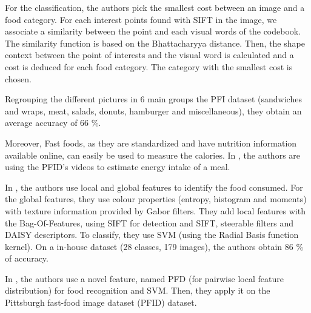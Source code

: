 For the classification, the authors pick the smallest cost between an image and a food category. For each interest points found with SIFT in the image, we associate a similarity between the point and each visual words of the codebook. The similarity function is based on the Bhattacharyya distance. Then, the shape context between the point of interests and the visual word is calculated and a cost is deduced for each food category. The category with the smallest cost is chosen.

Regrouping the different pictures in 6 main groups the PFI dataset (sandwiches and wraps, meat, salads, donuts, hamburger and miscellaneous), they obtain an average accuracy of 66 \%.

Moreover, Fast foods, as they are standardized and have nutrition information available online, can easily be used to measure the calories. In \cite{Wen2009}, the authors are using the PFID's videos to estimate energy intake of a meal.

In \cite{Bosch2011}, the authors use local and global features to identify the food consumed.
For the global features, they use colour properties (entropy, histogram and moments) with texture information provided by Gabor filters. They add local features with the Bag-Of-Features, using SIFT for detection and SIFT, steerable filters and DAISY descriptors. To classify, they use SVM (using the Radial Basis function kernel).
On a in-house dataset (28 classes, 179 images), the authors obtain 86 \% of accuracy.


In \cite{Yang2010}, the authors use a novel feature, named PFD (for pairwise local feature distribution) for food recognition and SVM. Then, they apply it on the Pittsburgh fast-food image dataset (PFID) dataset.

